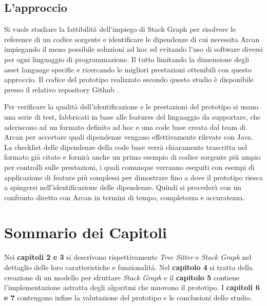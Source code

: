 \subsection{L'approccio}


Si vuole studiare la fattibilit\`a dell'impiego di Stack Graph per risolvere le reference di un codice sorgente e identificare le dipendenze di cui necessita Arcan impiegando il meno possibile soluzioni ad hoc ed evitando l'uso di software diversi per ogni linguaggio di programmazione. Il tutto limitando la dimensione degli asset language specific e ricercando le migliori prestazioni ottenibili con questo approccio. Il codice del prototipo realizzato secondo questo studio \`e disponibile presso il relativo repository Github \cite{SkullianRepository}.


Per verificare la qualit\`a dell'identificazione e le prestazioni del prototipo si usano una serie di test, fabbricati in base alle features del linguaggio da supportare, che aderiscono ad un formato definito ad hoc e una code base creata dal team di Arcan per accertare quali dipendenze vengano effettivamente rilevate con Java. La checklist delle dipendenze della code base verr\`a chiaramente trascritta nel formato gi\`a citato e fornir\`a anche un primo esempio di codice sorgente pi\`u ampio per controlli sulle prestazioni, i quali comunque verranno eseguiti con esempi di applicazione di feature pi\`u complessi per dimostrare fino a dove il prototipo riesca a spingersi nell'identificazione delle dipendenze. Quindi si proceder\`a con un confronto diretto con Arcan in termini di tempo, completezza e accuratezza.

\section{Sommario dei Capitoli}

Nei \textbf{capitoli 2 e 3} si descrivono rispettivamente \emph{Tree Sitter} e \emph{Stack Graph} nel dettaglio delle loro caratteristiche e funzionalit\`a. Nel \textbf{capitolo 4} si tratta della creazione di un modello per sfruttare \emph{Stack Graph} e il \textbf{capitolo 5} contiene l'implementazione astratta degli algoritmi che muovono il prototipo. I \textbf{capitoli 6 e 7} contengono infine la valutazione del prototipo e le conclusioni dello studio.
